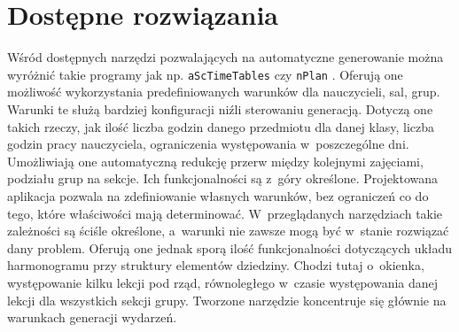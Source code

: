 \documentclass[a4paper]{book}
\begin{document}
\section{Dostępne rozwiązania}
Wśród dostępnych narzędzi pozwalających na automatyczne generowanie można wyróżnić takie programy jak np. \lstinline|aScTimeTables| \cite{id:aScTimetables} czy \lstinline|nPlan| \cite{id:nPlan}. Oferują one możliwość wykorzystania predefiniowanych warunków dla nauczycieli, sal, grup. Warunki te służą bardziej konfiguracji niźli sterowaniu generacją. Dotyczą one takich rzeczy, jak ilość liczba godzin danego przedmiotu dla danej klasy, liczba godzin pracy nauczyciela, ograniczenia występowania w~poszczególne dni. Umożliwiają one automatyczną redukcję przerw między kolejnymi zajęciami, podziału grup na sekcje. Ich funkcjonalności są z~góry określone. Projektowana aplikacja pozwala na zdefiniowanie własnych warunków, bez ograniczeń co do tego, które właściwości mają determinować. W~przeglądanych narzędziach takie zależności są ściśle określone, a~warunki nie zawsze mogą być w~stanie rozwiązać dany problem. Oferują one jednak sporą ilość funkcjonalności dotyczących układu harmonogramu przy struktury elementów dziedziny. Chodzi tutaj o~okienka, występowanie kilku lekcji pod rząd, równoległego w~czasie występowania danej lekcji dla wszystkich sekcji grupy. Tworzone narzędzie koncentruje się głównie na warunkach generacji wydarzeń.
\end{document}

